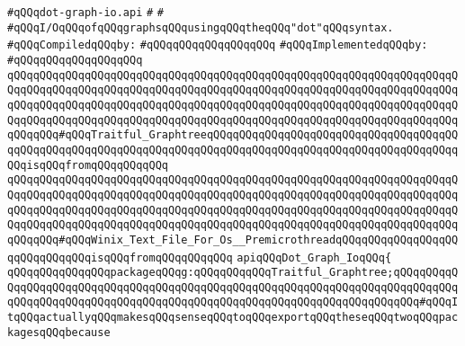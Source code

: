 \label{src/lib/std/dot/dot-graph-io.api}
\verb|#qQQqdot-graph-io.api|\newline
\verb|#|\newline
\verb|#|\newline
\verb|#qQQqI/OqQQqofqQQqgraphsqQQqusingqQQqtheqQQq"dot"qQQqsyntax.|\newline
\newline
\verb|#qQQqCompiledqQQqby:|\newline
\verb|#qQQqqQQqqQQqqQQqqQQq|\newline
\newline
\verb|#qQQqImplementedqQQqby:|\newline
\verb|#qQQqqQQqqQQqqQQqqQQq|\newline
\newline
\verb|qQQqqQQqqQQqqQQqqQQqqQQqqQQqqQQqqQQqqQQqqQQqqQQqqQQqqQQqqQQqqQQqqQQqqQQqqQQqqQQqqQQqqQQqqQQqqQQqqQQqqQQqqQQqqQQqqQQqqQQqqQQqqQQqqQQqqQQqqQQqqQQqqQQqqQQqqQQqqQQqqQQqqQQqqQQqqQQqqQQqqQQqqQQqqQQqqQQqqQQqqQQqqQQqqQQqqQQqqQQqqQQqqQQqqQQqqQQqqQQqqQQqqQQqqQQqqQQqqQQqqQQqqQQqqQQqqQQqqQQqqQQqqQQq#qQQqTraitful_GraphtreeqQQqqQQqqQQqqQQqqQQqqQQqqQQqqQQqqQQqqQQqqQQqqQQqqQQqqQQqqQQqqQQqqQQqqQQqqQQqqQQqqQQqqQQqqQQqqQQqqQQqqQQqqQQqqQQqisqQQqfromqQQqqQQqqQQq|\newline
\verb|qQQqqQQqqQQqqQQqqQQqqQQqqQQqqQQqqQQqqQQqqQQqqQQqqQQqqQQqqQQqqQQqqQQqqQQqqQQqqQQqqQQqqQQqqQQqqQQqqQQqqQQqqQQqqQQqqQQqqQQqqQQqqQQqqQQqqQQqqQQqqQQqqQQqqQQqqQQqqQQqqQQqqQQqqQQqqQQqqQQqqQQqqQQqqQQqqQQqqQQqqQQqqQQqqQQqqQQqqQQqqQQqqQQqqQQqqQQqqQQqqQQqqQQqqQQqqQQqqQQqqQQqqQQqqQQqqQQqqQQqqQQqqQQq#qQQqWinix_Text_File_For_Os__PremicrothreadqQQqqQQqqQQqqQQqqQQqqQQqqQQqqQQqisqQQqfromqQQqqQQqqQQq|\newline
\verb|apiqQQqDot_Graph_IoqQQq{|\newline
\newline
\verb|qQQqqQQqqQQqqQQqpackageqQQqg:qQQqqQQqqQQqTraitful_Graphtree;qQQqqQQqqQQqqQQqqQQqqQQqqQQqqQQqqQQqqQQqqQQqqQQqqQQqqQQqqQQqqQQqqQQqqQQqqQQqqQQqqQQqqQQqqQQqqQQqqQQqqQQqqQQqqQQqqQQqqQQqqQQqqQQqqQQqqQQqqQQqqQQq#qQQqItqQQqactuallyqQQqmakesqQQqsenseqQQqtoqQQqexportqQQqtheseqQQqtwoqQQqpackagesqQQqbecause|\newline
